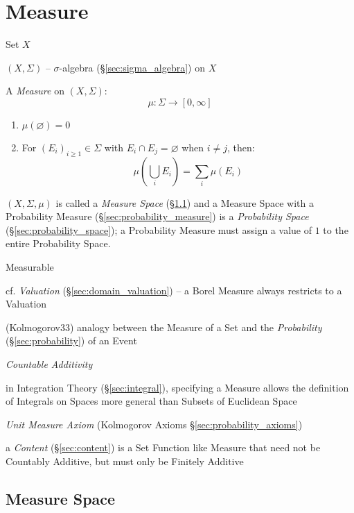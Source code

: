 \section{Measure}\label{sec:measure}

Set $X$

$(X,\Sigma)$ -- $\sigma$-algebra (\S\ref{sec:sigma_algebra}) on $X$

A \emph{Measure} on $(X,\Sigma)$:
\[
  \mu : \Sigma \rightarrow [0,\infty]
\]

\begin{enumerate}
  \item $\mu(\varnothing) = 0$

  \item For $(E_i)_{i \geq 1} \in \Sigma$ with $E_i \cap E_j =
    \varnothing$ when $i \neq j$, then:
    \[
      \mu (\bigcup_i E_i) = \sum_i \mu(E_i)
    \]
\end{enumerate}

$(X,\Sigma,\mu)$ is called a \emph{Measure Space} (\S\ref{sec:measure_space})
and a Measure Space with a Probability Measure
(\S\ref{sec:probability_measure}) is a \emph{Probability Space}
(\S\ref{sec:probability_space}); a Probability Measure must assign a value of
$1$ to the entire Probability Space.

Measurable

\fist cf. \emph{Valuation} (\S\ref{sec:domain_valuation}) -- a Borel Measure
always restricts to a Valuation

(Kolmogorov33) analogy between the Measure of a Set and the \emph{Probability}
(\S\ref{sec:probability}) of an Event

\emph{Countable Additivity}

in Integration Theory (\S\ref{sec:integral}), specifying a Measure allows the
definition of Integrals on Spaces more general than Subsets of Euclidean Space

\fist \emph{Unit Measure Axiom} (Kolmogorov Axioms
\S\ref{sec:probability_axioms})

\fist a \emph{Content} (\S\ref{sec:content}) is a Set Function like Measure that
need not be Countably Additive, but must only be Finitely Additive



\subsection{Measure Space}\label{sec:measure_space}


